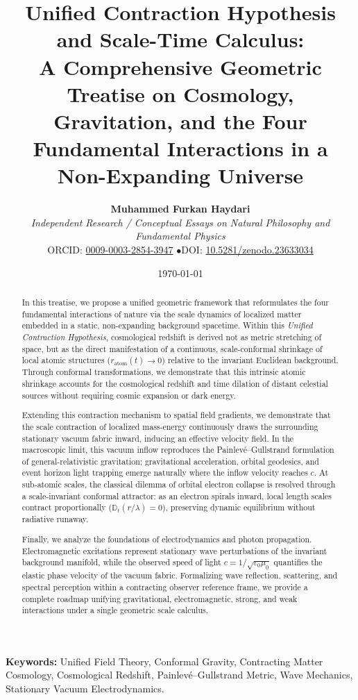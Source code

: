 \documentclass[11pt,a4paper]{article}
\title{\textbf{Unified Contraction Hypothesis and Scale-Time Calculus: \\ A Comprehensive Geometric Treatise on Cosmology, Gravitation, and the Four Fundamental Interactions in a Non-Expanding Universe}}
\author{
    \textbf{Muhammed Furkan Haydari} \\
    \textit{Independent Research / Conceptual Essays on Natural Philosophy and Fundamental Physics} \\
    \small ORCID: \href{https://orcid.org/0009-0003-2854-3947}{0009-0003-2854-3947} \quad$\bullet$\quad \small DOI: \href{https://doi.org/10.5281/zenodo.23633034}{10.5281/zenodo.23633034}
}
\date{\today}
\begin{document}
\maketitle

\begin{abstract}
    In this treatise, we propose a unified geometric framework that reformulates the four fundamental interactions of nature via the scale dynamics of localized matter embedded in a static, non-expanding background spacetime. Within this \textit{Unified Contraction Hypothesis}, cosmological redshift is derived not as metric stretching of space, but as the direct manifestation of a continuous, scale-conformal shrinkage of local atomic structures ($r_{\mathrm{atom}}(t) \to 0$) relative to the invariant Euclidean background. Through conformal transformations, we demonstrate that this intrinsic atomic shrinkage accounts for the cosmological redshift and time dilation of distant celestial sources without requiring cosmic expansion or dark energy.

    Extending this contraction mechanism to spatial field gradients, we demonstrate that the scale contraction of localized mass-energy continuously draws the surrounding stationary vacuum fabric inward, inducing an effective velocity field. In the macroscopic limit, this vacuum inflow reproduces the Painlev\'e--Gullstrand formulation of general-relativistic gravitation; gravitational acceleration, orbital geodesics, and event horizon light trapping emerge naturally where the inflow velocity reaches $c$. At sub-atomic scales, the classical dilemma of orbital electron collapse is resolved through a scale-invariant conformal attractor: as an electron spirals inward, local length scales contract proportionally ($\mathbb{D}_t(r/\lambda) = 0$), preserving dynamic equilibrium without radiative runaway.

    Finally, we analyze the foundations of electrodynamics and photon propagation. Electromagnetic excitations represent stationary wave perturbations of the invariant background manifold, while the observed speed of light $c = 1/\sqrt{\varepsilon_0\mu_0}$ quantifies the elastic phase velocity of the vacuum fabric. Formalizing wave reflection, scattering, and spectral perception within a contracting observer reference frame, we provide a complete roadmap unifying gravitational, electromagnetic, strong, and weak interactions under a single geometric scale calculus.
\end{abstract}

\vspace{1em}
\noindent\textbf{Keywords:} Unified Field Theory, Conformal Gravity, Contracting Matter Cosmology, Cosmological Redshift, Painlev\'e--Gullstrand Metric, Wave Mechanics, Stationary Vacuum Electrodynamics.
\end{document}

